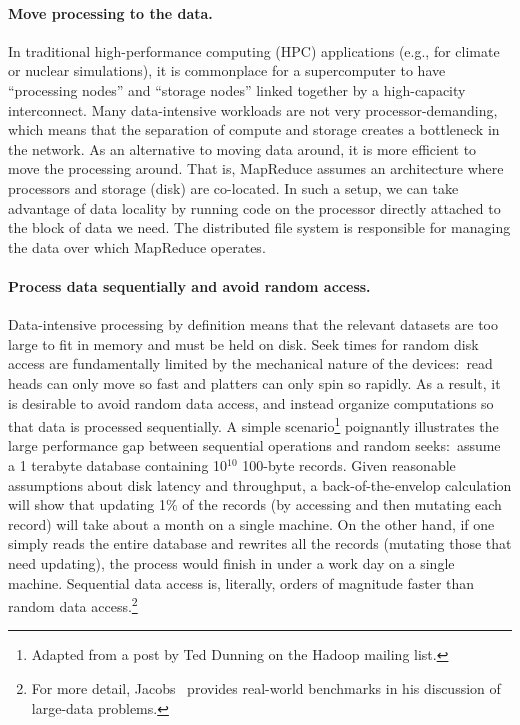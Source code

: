 \paragraph{Move processing to the data.}
In traditional high-performance computing (HPC) applications (e.g.,
for climate or nuclear simulations), it is commonplace for a
supercomputer to have ``processing nodes'' and ``storage nodes''
linked together by a high-capacity interconnect.  Many data-intensive
workloads are not very processor-demanding, which means that the
separation of compute and storage creates a bottleneck in the network.
As an alternative to moving data around, it is more efficient to move
the processing around.  That is, MapReduce assumes an architecture
where processors and storage (disk) are co-located.  In such a setup,
we can take advantage of data locality by running code on the
processor directly attached to the block of data we need.  The
distributed file system is responsible for managing the data over
which MapReduce operates.

\paragraph{Process data sequentially and avoid random access.}
Data-intensive processing by definition means that the relevant
datasets are too large to fit in memory and must be held on disk.
Seek times for random disk access are fundamentally limited by the
mechanical nature of the devices:\ read heads can only move so fast
and platters can only spin so rapidly.  As a result, it is desirable
to avoid random data access, and instead organize computations so that
data is processed sequentially.  A simple scenario\footnote{Adapted
  from a post by Ted Dunning on the Hadoop mailing list.} poignantly
illustrates the large performance gap between sequential operations
and random seeks:\ assume a 1 terabyte database containing 10$^{10}$
100-byte records.  Given reasonable assumptions about disk latency and
throughput, a back-of-the-envelop calculation will show that updating
1$\%$ of the records (by accessing and then mutating each record) will
take about a month on a single machine.  On the other hand, if one
simply reads the entire database and rewrites all the records
(mutating those that need updating), the process would finish in under
a work day on a single machine.  Sequential data access is, literally,
orders of magnitude faster than random data access.\footnote{For more
  detail, Jacobs~\cite{JacobsAdam_2009} provides real-world benchmarks
  in his discussion of large-data problems.}

